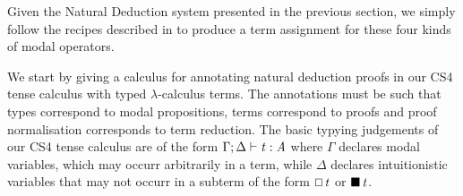 Given the Natural Deduction system presented in the previous section,
we simply follow the recipes described in \cite{barber1997} to produce
a term assignment for these four kinds of modal operators.

We start by giving a calculus for annotating natural deduction proofs
in our CS4 tense calculus with typed $\lambda$-calculus terms. The
annotations must be such that types correspond to modal propositions,
terms correspond to proofs and proof normalisation corresponds to term
reduction. The basic typying judgements of our CS4 tense calculus are
of the form $\Gamma  ;  \Delta  \vdash  \mathit{t}  :  \mathit{A}$ where $\Gamma$ declares modal
variables, which may occurr arbitrarily in a term, while $\Delta$
declares intuitionistic variables that may not occurr in a subterm of
the form $\oblong \, \mathit{t}$ or $\blacksquare \, \mathit{t}$.

